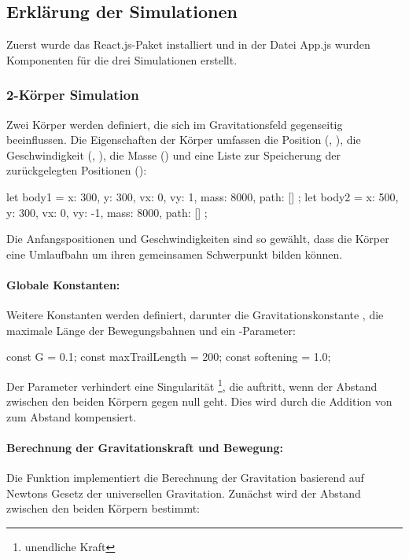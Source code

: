 \documentclass[a4paper,12pt,twoside]{article}
\begin{document}
\subsection{Erklärung der Simulationen}
Zuerst wurde das React.js-Paket installiert und in der Datei App.js wurden Komponenten für die drei Simulationen erstellt.
\subsubsection{2-Körper Simulation}
Zwei Körper werden definiert, die sich im Gravitationsfeld gegenseitig beeinflussen. Die Eigenschaften der Körper umfassen die Position (, ), die Geschwindigkeit (, ), die Masse () und eine Liste zur Speicherung der zurückgelegten Positionen ():

\begin{javascript}
let body1 = { x: 300, y: 300, vx: 0, vy: 1, mass: 8000, path: [] };
let body2 = { x: 500, y: 300, vx: 0, vy: -1, mass: 8000, path: [] };
\end{javascript}

Die Anfangspositionen und Geschwindigkeiten sind so gewählt, dass die Körper eine Umlaufbahn um ihren gemeinsamen Schwerpunkt bilden können.

\paragraph{Globale Konstanten:}
Weitere Konstanten werden definiert, darunter die Gravitationskonstante , die maximale Länge der Bewegungsbahnen und ein -Parameter:

\begin{javascript}
const G = 0.1;
const maxTrailLength = 200;
const softening = 1.0;
\end{javascript}

Der Parameter  verhindert eine Singularität \footnote{unendliche Kraft}, die auftritt, wenn der Abstand zwischen den beiden Körpern gegen null geht. Dies wird durch die Addition von  zum Abstand kompensiert.

\paragraph{Berechnung der Gravitationskraft und Bewegung:}
Die Funktion  implementiert die Berechnung der Gravitation basierend auf Newtons Gesetz der universellen Gravitation. Zunächst wird der Abstand zwischen den beiden Körpern bestimmt:
\end{document}
